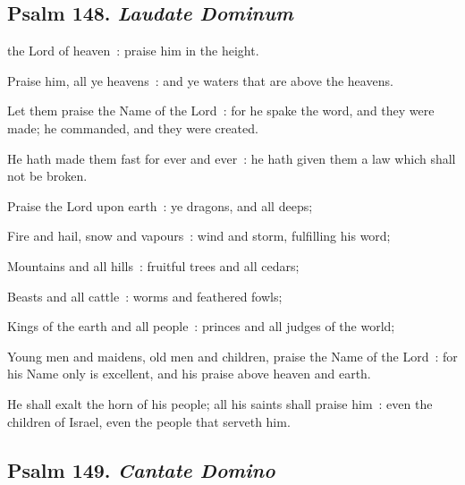 \subsection{Psalm 148. \textit{Laudate Dominum}}


 the Lord of heaven~: praise him in the height.\par
{}
Praise him, all ye heavens~: and ye waters that are above the heavens.\par
{}Let them praise the Name of the Lord~: for he spake the word, and they were made; he commanded, and they were created.\par
{}He hath made them fast for ever and ever~: he hath given them a law which shall not be broken.\par
{}Praise the Lord upon earth~: ye dragons, and all deeps;\par
{}Fire and hail, snow and vapours~: wind and storm, fulfilling his word;\par
{}Mountains and all hills~: fruitful trees and all cedars;\par
{}Beasts and all cattle~: worms and feathered fowls;\par
{}Kings of the earth and all people~: princes and all judges of the world;\par
{}Young men and maidens, old men and children, praise the Name of the Lord~: for his Name only is excellent, and his praise above heaven and earth.\par
{}He shall exalt the horn of his people; all his saints shall praise him~: even the children of Israel, even the people that serveth him.\par

\subsection{Psalm 149. \textit{Cantate Domino}}



